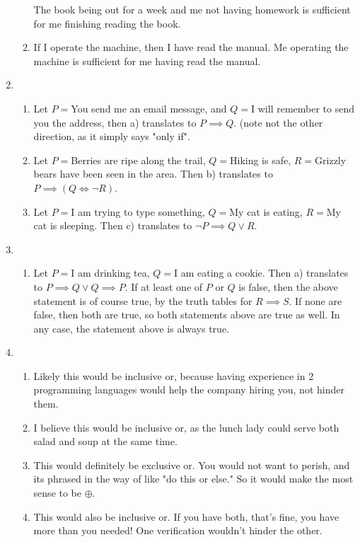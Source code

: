 \documentclass[12pt]{article}
\theoremstyle{definition}
\theoremstyle{remark}
\begin{document}
\begin{enumerate}[leftmargin=\labelsep]
\begin{enumerate}
			The book being out for a week and me not having homework is sufficient for me finishing reading the book.
			
			\item 
			If I operate the machine, then I have read the manual.
			Me operating the machine is sufficient for me having read the manual.
		\end{enumerate}
	\item 
		\begin{enumerate}
			\item Let $P=$You send me an email message, and $Q=$I will remember to send you the address, then a) translates to $P \implies Q$. (note not the other direction, as it simply says "only if".
			\item 
			Let $P=$Berries are ripe along the trail, $Q=$Hiking is safe, $R=$Grizzly bears have been seen in the area. Then b) translates to $P \implies (Q \iff \lnot R)$.
			\item 
			Let $P=$I am trying to type something, $Q=$My cat is eating, $R=$My cat is sleeping. Then c) translates to $\lnot P \implies Q \lor R$.
		\end{enumerate}
	\item 
		\begin{enumerate}
			\item Let $P=$I am drinking tea, $Q=$I am eating a cookie. Then a) translates to $P \implies Q \lor Q \implies P$. If at least one of $P$ or $Q$ is false, then the above statement is of course true, by the truth tables for $R \implies S$. If none are false, then both are true, so both statements above are true as well. In any case, the statement above is always true.
		\end{enumerate}
	\item 
		\begin{enumerate}
			\item Likely this would be inclusive or, because having experience in 2 programming languages would help the company hiring you, not hinder them. 
			\item 
			I believe this would be inclusive or, as the lunch lady could serve both salad and soup at the same time. 
			\item 
			This would definitely be exclusive or. You would not want to perish, and its phrased in the way of like "do this or else." So it would make the most sense to be $\oplus$.
			\item 
			This would also be inclusive or. If you have both, that's fine, you have more than you needed! One verification wouldn't hinder the other.
		\end{enumerate}
	\end{enumerate}
\end{document}
